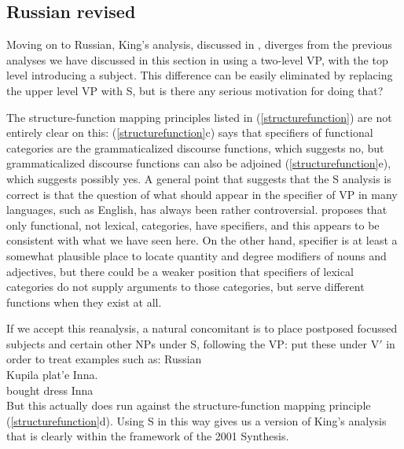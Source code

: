 \documentclass[output=paper,hidelinks]{langscibook}
\begin{document}
\subsection{Russian revised}\label{ltwoconfrev}
Moving on to Russian, King's analysis, discussed in ,
diverges from the previous analyses we have discussed in this section in using a
two-level VP, with the top level introducing a subject.  This difference can
be easily eliminated by replacing the upper level VP with S, but is there
any serious motivation for doing that?

The structure-function mapping principles listed in (\ref{structurefunction})
are not entirely clear on this: (\ref{structurefunction}c) says that specifiers of functional categories
are the grammaticalized discourse functions, which suggests no, but grammaticalized
discourse functions can also be adjoined (\ref{structurefunction}e), which suggests possibly yes.
A general point that suggests that the S analysis is correct is that the
question of what should appear in the specifier of VP in many languages, such
as English, has always been rather controversial.  \citet{fukui1986} proposes
that only functional, not lexical, categories, have specifiers, and this appears
to be consistent with what we have seen here.  On the other hand,
specifier is at least a somewhat plausible place to locate quantity and degree
modifiers of nouns and adjectives, but there could be a weaker position that
specifiers of lexical  categories do not supply arguments to those categories,
but serve different functions when they exist at all.

If we accept this reanalysis, a natural concomitant is to place postposed
focussed subjects and certain other NPs under S, following the VP:
\ea
{}
\z
\citet[210]{King95} put these under V$'$ in order to treat examples
such as:
\ea\label{rusfinsub} Russian \citep[209]{King95}\\
\gll Kupila plat'e Inna.\\
bought dress Inna\\
\z
But this actually does run against the structure-function mapping
principle (\ref{structurefunction}d).  Using S in this way gives us a version of King's analysis
that is clearly within the framework of the 2001 Synthesis.
\end{document}
